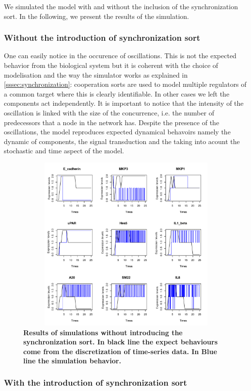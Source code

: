 We simulated the model with and without the inclusion of the synchronization sort. In the following, we present the results of 
the simulation.

\subsubsection{Without the introduction of synchronization sort}
One can easily notice in  the occurence of oscillations. This is not the expected behavior from the biological system
but it is coherent with the choice of modelisation and the way the simulator works as explained in \ref{sssec:synchronization}: cooperation
sorts are used to model multiple regulators of a common target
where this is clearly identifiable. In other cases we left the components act independently.
It is important to notice that the intensity of the oscillation is linked with 
the size of the concurrence, i.e. the number of predecessors that a node in the network has.
Despite the presence of the oscillations, the model reproduces expected dynamical behavoirs  namely
the dynamic of components, the signal transduction and the taking into acount the stochastic and time aspect of the model.

\begin{figure}[!t]
\centering
\includegraphics[width=6.5in,height=3.5in]{images/resultWOS.pdf}
\caption{\bf Results of simulations without introducing the synchronization sort. In black line the expect behaviours
come from the discretization of time-series data. In Blue line the simulation behavior.}
\label{fig:rwos}
\end{figure}
\subsubsection{With the introduction of synchronization sort}


